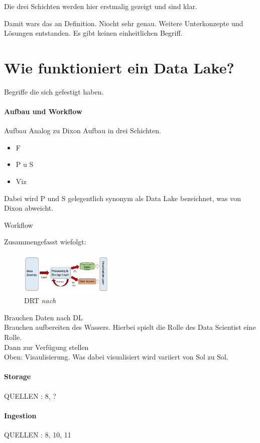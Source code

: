 \documentclass[twoside,twocolumn]{article}
\begin{document}
Die drei Schichten werden hier erstmalig gezeigt und sind klar.

Damit wars das an Definition. Niocht sehr genau. Weitere Unterkonzepte und Lösungen entstanden. Es gibt keinen einheitlichen Begriff.\cite{src7}

\section{Wie funktioniert ein Data Lake?}
Begriffe die sich gefestigt haben.

\paragraph{Aufbau und Workflow}
Aufbau
Analog zu Dixon Aufbau in drei Schichten.\cite{src8} \cite{src9}
\begin{itemize}
	\item F
	\item P u S
	\item Viz
\end{itemize}
Dabei wird P und S gelegentlich synonym als Data Lake bezeichnet, was von Dixon abweicht.

Workflow

Zusammengefasst wiefolgt:

\begin{figure}[h]
	\centering 
	\includegraphics[width=0.4\textwidth]{img/p4} 
	\caption[DRT]{DRT \textit{nach} \cite{src9}}	
\end{figure}


Brauchen Daten nach DL\\
Brauchen aufbereiten des Wassers. Hierbei spielt die Rolle des Data Scientist eine Rolle.\cite{src8}\\
Dann zur Verfügung stellen\\
Oben: Visaulisierung. Was dabei visualisiert wird variiert von Sol zu Sol.


\paragraph{Storage}
QUELLEN : 8, ?
\paragraph{Ingestion}
QUELLEN : 8, 10, 11
\end{document}
